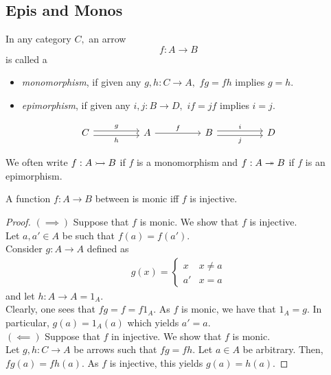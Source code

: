 \subsection{Epis and Monos}
\begin{defn} 
	In any category $C,$ an arrow
	\begin{equation*} 
		f:A\to B
	\end{equation*}
	is called a 
	\begin{itemize}
		\item \emph{monomorphism}, if given any $g, h:C\to A,$ $fg = fh$ implies $g = h.$
		\item \emph{epimorphism}, if given any $i, j:B\to D,$ $if = jf$ implies $i = j.$
	\end{itemize}
	\begin{equation*} 
		\begin{tikzcd}
		C \arrow[rr, "h"', shift right] \arrow[rr, "g", shift left] &  & A \arrow[rr, "f"] &  & B \arrow[rr, "i", shift left] \arrow[rr, "j"', shift right] &  & D
		\end{tikzcd}
	\end{equation*}
\end{defn}	
We often write $f:A\rightarrowtail B$ if $f$ is a monomorphism and $f:A \twoheadrightarrow B$ if $f$ is an epimorphism.
\begin{prop} \label{prop:monin}
	A function $f:A\to B$ between is monic iff $f$ is injective.
\end{prop}
\begin{proof} 
	$(\implies)$ Suppose that $f$ is monic. We show that $f$ is injective. \\
	Let $a, a' \in A$ be such that $f(a) = f(a').$\\
	Consider $g:A \to A$ defined as
	\begin{align*} 
		g(x) = \begin{cases}
			x & x \neq a\\
			a' & x = a
		\end{cases}
	\end{align*}
	and let $h:A \to A = 1_A.$\\
	Clearly, one sees that $fg = f = f1_A.$ As $f$ is monic, we have that $1_A = g.$ In particular, $g(a) = 1_A(a)$ which yields $a' = a.$\\
	$(\impliedby)$ Suppose that $f$ in injective. We show that $f$ is monic.\\
	Let $g, h:C\to A$ be arrows such that $fg = fh.$ Let $a \in A$ be arbitrary. Then, $fg(a) = fh(a).$ As $f$ is injective, this yields $g(a) = h(a).$
\end{proof}
